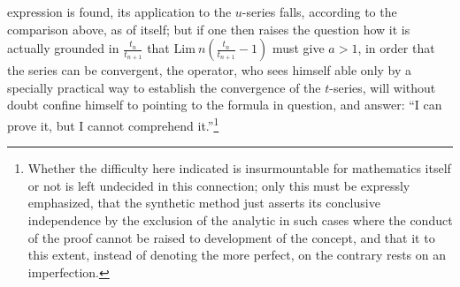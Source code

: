\documentclass[12pt,a4paper,openany]{book}
\begin{document}
expression is found, its application to the $u$-series falls, according to the comparison above, as of itself; but
if one then raises the question how it is actually
grounded in $\frac{t_{n}}{t_{n+1}}$ that $\mathrm{Lim}\ n\left(\frac{t_{n}}{t_{n+1}}-1\right)$ must give
$a>1$, in order that the series can be convergent, the operator, who sees himself able only by a specially practical way to
establish the convergence of the $t$-series, will without doubt confine himself
to pointing to the formula in question, and answer: ``I
can prove it, but I cannot comprehend it.''\footnote[1]{Whether the difficulty here indicated is insurmountable for mathematics itself or not is left undecided in this connection; only this must be expressly emphasized, that the synthetic method just asserts its conclusive independence by the exclusion of the analytic in such cases where the conduct of the proof cannot be raised to development of the concept, and that it to this extent, instead of denoting the more perfect, on the contrary rests on an imperfection.}
\end{document}
